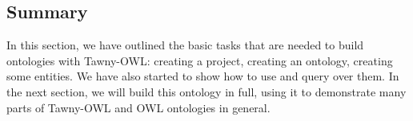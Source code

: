 \subsection{Summary}
\label{sec-4-5}

In this section, we have outlined the basic tasks that are needed to
build ontologies with Tawny-OWL: creating a project, creating an
ontology, creating some entities. We have also started to show how to
use and query over them. In the next section, we will build this
ontology in full, using it to demonstrate many parts of Tawny-OWL and
OWL ontologies in general.

